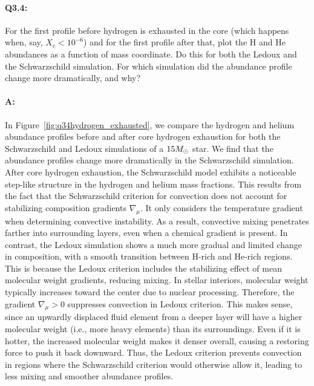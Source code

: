 \documentclass[twocolumn,fontsize=11pt]{scrartcl}
\begin{document}
\paragraph{Q3.4:} For the first profile before hydrogen is exhausted in the core (which happens when, say, \(X_c < 10^{-6}\)) and for the first profile after that, plot the H and He abundances as a function of mass coordinate. Do this for both the Ledoux and the Schwarzschild simulation. For which simulation did the abundance profile change more dramatically, and why?

\paragraph{A:} In Figure~\ref{fig:q34hydrogen_exhausted}, we compare the hydrogen and helium abundance profiles before and after core hydrogen exhaustion for both the Schwarzschild and Ledoux simulations of a $15M_\odot$ star. We find that the abundance profiles change more dramatically in the Schwarzschild simulation. After core hydrogen exhaustion, the Schwarzschild model exhibits a noticeable step-like structure in the hydrogen and helium mass fractions. This results from the fact that the Schwarzschild criterion for convection does not account for stabilizing composition gradients \(\nabla_\mu\). It only considers the temperature gradient when determining convective instability. As a result, convective mixing penetrates farther into surrounding layers, even when a chemical gradient is present. In contrast, the Ledoux simulation shows a much more gradual and limited change in composition, with a smooth transition between H-rich and He-rich regions. This is because the Ledoux criterion includes the stabilizing effect of mean molecular weight gradients, reducing mixing. In stellar interiors, molecular weight typically increases toward the center due to nuclear processing. Therefore, the gradient \(\nabla_\mu > 0\) suppresses convection in Ledoux criterion. This makes sense, since an upwardly displaced fluid element from a deeper layer will have a higher molecular weight (i.e., more heavy elements) than its surroundings. Even if it is hotter, the increased molecular weight makes it denser overall, causing a restoring force to push it back downward. Thus, the Ledoux criterion prevents convection in regions where the Schwarzschild criterion would otherwise allow it, leading to less mixing and smoother abundance profiles.
\end{document}
